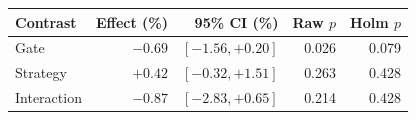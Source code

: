 \begin{tabular}{@{}lrrrr@{}}
\toprule
Contrast & Effect (\%) & 95\% CI (\%) & Raw $p$ & Holm $p$ \\
\midrule
Gate & $-0.69$ & $[-1.56, +0.20]$ & 0.026 & 0.079 \\
Strategy & $+0.42$ & $[-0.32, +1.51]$ & 0.263 & 0.428 \\
Interaction & $-0.87$ & $[-2.83, +0.65]$ & 0.214 & 0.428 \\
\bottomrule
\end{tabular}
